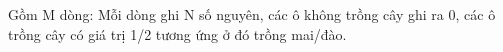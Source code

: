 Gồm M dòng: Mỗi dòng ghi N số nguyên, các ô không trồng cây ghi ra 0, các ô trồng cây có giá trị 1/2 tương ứng ở đó trồng mai/đào.